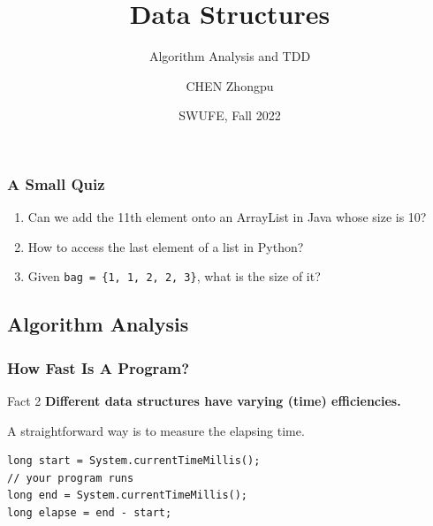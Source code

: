 \documentclass[aspectratio=169, 14pt]{beamer}
\title[Data Structures] %
{Data Structures}
\subtitle{Algorithm Analysis and TDD}
\author[CHEN Zhongpu] %
{CHEN Zhongpu}
\institute[] %
{
  School of Computing and Artificial Intelligence \\
  \href{mailto:zpchen@swufe.edu.cn}{zpchen@swufe.edu.cn}
}
\date[] %
{SWUFE, Fall 2022}
\begin{document}
\frame{\titlepage}

\begin{frame}
    \frametitle{A Small Quiz}
    \begin{enumerate}
        \item<1->  Can we add the 11th element onto an \alert{ArrayList} in Java whose size is 10?
        \item<2->  How to access the last element of a 
        \alert{list} in Python?
        \item<3->  Given \texttt{bag = \{1, 1, 2, 2, 3\}}, what is the size of it?
    \end{enumerate}
\end{frame}

{
    \begin{frame}
        \section{\textcolor{darkmidnightblue}{Algorithm Analysis}}
    \end{frame}
}
\begin{frame}[fragile]
    \frametitle{How Fast Is A Program?}
    \begin{block}{Fact 2}
        \textbf{Different data structures have varying (time) \alert{efficiencies}.}
    \end{block} 
A straightforward way is to measure the elapsing time.
\begin{verbatim}
long start = System.currentTimeMillis();
// your program runs
long end = System.currentTimeMillis();
long elapse = end - start;    
\end{verbatim}
\end{frame}
\end{document}
